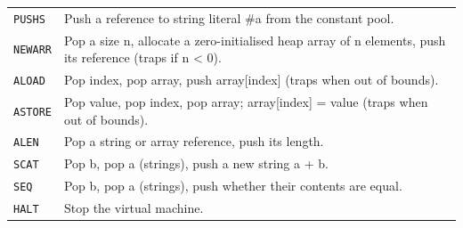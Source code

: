 \begin{longtable}{@{}lp{}@{}}
\texttt{PUSHS} & Push a reference to string literal \#a from the constant pool.\\
\texttt{NEWARR} & Pop a size n, allocate a zero-initialised heap array of n elements, push its reference (traps if n \textless{} 0).\\
\texttt{ALOAD} & Pop index, pop array, push array[index] (traps when out of bounds).\\
\texttt{ASTORE} & Pop value, pop index, pop array; array[index] = value (traps when out of bounds).\\
\texttt{ALEN} & Pop a string or array reference, push its length.\\
\texttt{SCAT} & Pop b, pop a (strings), push a new string a + b.\\
\texttt{SEQ} & Pop b, pop a (strings), push whether their contents are equal.\\
\texttt{HALT} & Stop the virtual machine.\\
\bottomrule
\end{longtable}
